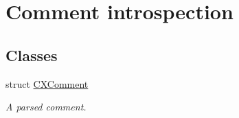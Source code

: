 \hypertarget{group__CINDEX__COMMENT}{}\section{Comment introspection}
\label{group__CINDEX__COMMENT}
\subsection*{Classes}
\begin{DoxyCompactItemize}
\item 
struct \hyperlink{structCXComment}{C\+X\+Comment}
\begin{DoxyCompactList}\small\item\em A parsed comment. \end{DoxyCompactList}\end{DoxyCompactItemize}
